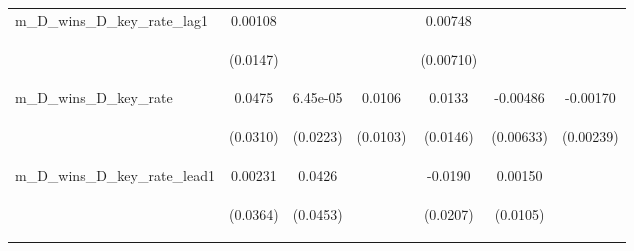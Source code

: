 \documentclass[]{article}
\begin{document}
\begin{center}
\begin{tabular}{lcccccc}
m\_D\_wins\_D\_key\_rate\_lag1 & 0.00108 &  &  & 0.00748 &  &  \\
\vspace{4pt} & \begin{footnotesize}(0.0147)\end{footnotesize} & \begin{footnotesize}\end{footnotesize} & \begin{footnotesize}\end{footnotesize} & \begin{footnotesize}(0.00710)\end{footnotesize} & \begin{footnotesize}\end{footnotesize} & \begin{footnotesize}\end{footnotesize} \\
m\_D\_wins\_D\_key\_rate & 0.0475 & 6.45e-05 & 0.0106 & 0.0133 & -0.00486 & -0.00170 \\
\vspace{4pt} & \begin{footnotesize}(0.0310)\end{footnotesize} & \begin{footnotesize}(0.0223)\end{footnotesize} & \begin{footnotesize}(0.0103)\end{footnotesize} & \begin{footnotesize}(0.0146)\end{footnotesize} & \begin{footnotesize}(0.00633)\end{footnotesize} & \begin{footnotesize}(0.00239)\end{footnotesize} \\
m\_D\_wins\_D\_key\_rate\_lead1 & 0.00231 & 0.0426 &  & -0.0190 & 0.00150 &  \\
\vspace{4pt} & \begin{footnotesize}(0.0364)\end{footnotesize} & \begin{footnotesize}(0.0453)\end{footnotesize} & \begin{footnotesize}\end{footnotesize} & \begin{footnotesize}(0.0207)\end{footnotesize} & \begin{footnotesize}(0.0105)\end{footnotesize} & \begin{footnotesize}\end{footnotesize} \\

\end{tabular}
\end{center}
\end{document}
